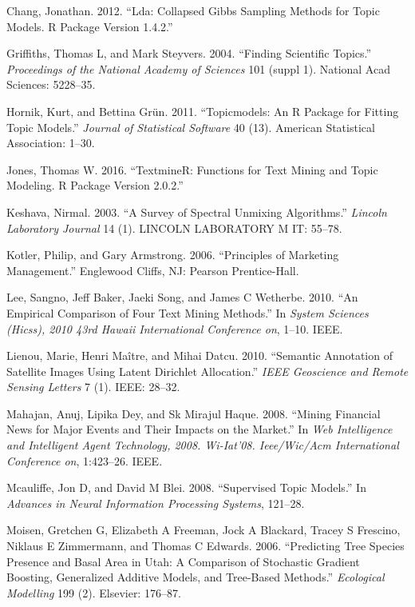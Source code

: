 \documentclass[article]{jss}
\begin{document}
\hypertarget{ref-chang2012lda}{}
Chang, Jonathan. 2012. ``Lda: Collapsed Gibbs Sampling Methods for Topic
Models. R Package Version 1.4.2.''

\hypertarget{ref-griffiths2004finding}{}
Griffiths, Thomas L, and Mark Steyvers. 2004. ``Finding Scientific
Topics.'' \emph{Proceedings of the National Academy of Sciences} 101
(suppl 1). National Acad Sciences: 5228--35.

\hypertarget{ref-hornik2011topicmodels}{}
Hornik, Kurt, and Bettina Grün. 2011. ``Topicmodels: An R Package for
Fitting Topic Models.'' \emph{Journal of Statistical Software} 40 (13).
American Statistical Association: 1--30.

\hypertarget{ref-jones2016}{}
Jones, Thomas W. 2016. ``TextmineR: Functions for Text Mining and Topic
Modeling. R Package Version 2.0.2.''

\hypertarget{ref-keshava2003survey}{}
Keshava, Nirmal. 2003. ``A Survey of Spectral Unmixing Algorithms.''
\emph{Lincoln Laboratory Journal} 14 (1). LINCOLN LABORATORY M IT:
55--78.

\hypertarget{ref-kotler2006principles}{}
Kotler, Philip, and Gary Armstrong. 2006. ``Principles of Marketing
Management.'' Englewood Cliffs, NJ: Pearson Prentice-Hall.

\hypertarget{ref-lee2010empirical}{}
Lee, Sangno, Jeff Baker, Jaeki Song, and James C Wetherbe. 2010. ``An
Empirical Comparison of Four Text Mining Methods.'' In \emph{System
Sciences (Hicss), 2010 43rd Hawaii International Conference on}, 1--10.
IEEE.

\hypertarget{ref-lienou2010semantic}{}
Lienou, Marie, Henri Maître, and Mihai Datcu. 2010. ``Semantic
Annotation of Satellite Images Using Latent Dirichlet Allocation.''
\emph{IEEE Geoscience and Remote Sensing Letters} 7 (1). IEEE: 28--32.

\hypertarget{ref-mahajan2008mining}{}
Mahajan, Anuj, Lipika Dey, and Sk Mirajul Haque. 2008. ``Mining
Financial News for Major Events and Their Impacts on the Market.'' In
\emph{Web Intelligence and Intelligent Agent Technology, 2008.
Wi-Iat'08. Ieee/Wic/Acm International Conference on}, 1:423--26. IEEE.

\hypertarget{ref-mcauliffe2008supervised}{}
Mcauliffe, Jon D, and David M Blei. 2008. ``Supervised Topic Models.''
In \emph{Advances in Neural Information Processing Systems}, 121--28.

\hypertarget{ref-moisen2006predicting}{}
Moisen, Gretchen G, Elizabeth A Freeman, Jock A Blackard, Tracey S
Frescino, Niklaus E Zimmermann, and Thomas C Edwards. 2006. ``Predicting
Tree Species Presence and Basal Area in Utah: A Comparison of Stochastic
Gradient Boosting, Generalized Additive Models, and Tree-Based
Methods.'' \emph{Ecological Modelling} 199 (2). Elsevier: 176--87.
\end{document}
